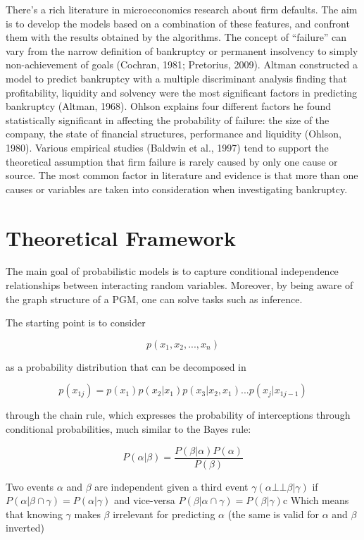 \documentclass[
]{article}
\begin{document}
There's a rich literature in microeconomics research about firm
defaults. The aim is to develop the models based on a combination of
these features, and confront them with the results obtained by the
algorithms. The concept of ``failure'' can vary from the narrow
definition of bankruptcy or permanent insolvency to simply
non-achievement of goals (Cochran, 1981; Pretorius, 2009). Altman
constructed a model to predict bankruptcy with a multiple discriminant
analysis finding that profitability, liquidity and solvency were the
most significant factors in predicting bankruptcy (Altman, 1968). Ohlson
explains four different factors he found statistically significant in
affecting the probability of failure: the size of the company, the state
of financial structures, performance and liquidity (Ohlson, 1980).
Various empirical studies (Baldwin et al., 1997) tend to support the
theoretical assumption that firm failure is rarely caused by only one
cause or source. The most common factor in literature and evidence is
that more than one causes or variables are taken into consideration when
investigating bankruptcy.

\hypertarget{theoretical-framework}{%
\section{Theoretical Framework}\label{theoretical-framework}}

The main goal of probabilistic models is to capture conditional
independence relationships between interacting random variables.
Moreover, by being aware of the graph structure of a PGM, one can solve
tasks such as inference.

The starting point is to consider

\[p(x_1, x_2, ..., x_n)\]

as a probability distribution that can be decomposed in

\[p(x_{1j}) = p(x_1)p(x_2|x_1)p(x_3|x_2, x_1)...p(x_j|x_{1j-1})\]

through the chain rule, which expresses the probability of interceptions
through conditional probabilities, much similar to the Bayes rule:

\[P(α|β) = \frac{P(β|α)P(α)}{P(β)}\]

Two events \(α\) and \(β\) are independent given a third event
\(γ (α ⊥⊥ β|γ)\) if \(P(α|β ∩ γ) = P(α|γ)\) and vice-versa
\(P(β|α ∩ γ) = P(β|γ)\)c Which means that knowing \(γ\) makes \(β\)
irrelevant for predicting \(α\) (the same is valid for \(α\) and \(β\)
inverted)
\end{document}
